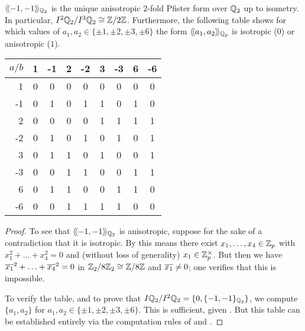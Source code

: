\documentclass[12pt, leqno, british]{amsart}
\begin{document}
\begin{prop}\label{P:2-fold-Pfister-qq2}
$\langle\!\langle -1, -1 \rangle\!\rangle_{\mathbb Q_2}$ is the unique anisotropic $2$-fold Pfister form over $\mathbb Q_2$ up to isometry.
In particular, $I^2\mathbb Q_2/I^3\mathbb Q_2 \cong \mathbb Z/2\mathbb Z$.
Furthermore, the following table shows for which values of $a_1, a_2 \in \lbrace \pm 1, \pm 2, \pm 3, \pm 6 \rbrace$ the form $\langle\!\langle a_1, a_2 \rangle\!\rangle_{\mathbb Q_p}$ is isotropic ($0$) or anisotropic ($1$).

\centering
\begin{tabular}{r | c c c c c c c c}
$a/b$ & 1 & -1 & 2 & -2 & 3 & -3 & 6 & -6 \\ \hline
1 & 0 & 0 & 0 & 0 & 0 & 0 & 0 & 0 \\
-1 & 0 & 1 & 0 & 1 & 1& 0 & 1 & 0 \\
2 & 0 & 0 & 0 & 0 & 1 & 1 & 1 & 1 \\
-2 & 0 & 1 & 0 & 1 & 0 & 1 & 0 & 1 \\
3 & 0 & 1 & 1 & 0 & 1 & 0 & 0 & 1\\
-3 & 0 & 0 & 1 & 1 & 0 & 0 & 1 & 1 \\
6 & 0 & 1 & 1 & 0 & 0 & 1 & 1 & 0 \\
-6 & 0 & 0 & 1 & 1 & 1 & 1 & 0 & 0
\end{tabular}
\end{prop}
\begin{proof}
To see that $\langle\!\langle -1, -1 \rangle\!\rangle_{\mathbb Q_2}$ is anisotropic, suppose for the sake of a contradiction that it is isotropic.
By  this means there exist $x_1, \ldots, x_4 \in \mathbb Z_p$ with $x_1^2 + \ldots + x_4^2 = 0$ and (without loss of generality) $x_1 \in \mathbb Z_p^\times$.
But then we have $\overline{x_1}^2 + \ldots + \overline{x_4}^2 = 0$ in $\mathbb Z_2/8\mathbb Z_2 \cong \mathbb Z/8\mathbb Z$ and $\overline{x_1} \neq 0$; one verifies that this is impossible.

To verify the table, and to prove that $I\mathbb Q_2/I^2\mathbb Q_2 = \lbrace 0, \lbrace -1, -1 \rbrace_{\mathbb Q_2} \rbrace$, we compute $\lbrace a_1, a_2 \rbrace$ for $a_1, a_2 \in \lbrace \pm 1, \pm 2, \pm 3, \pm 6 \rbrace$. This is sufficient, given .
But this table can be established entirely via the computation rules of  and .
\end{proof}
\end{document}
